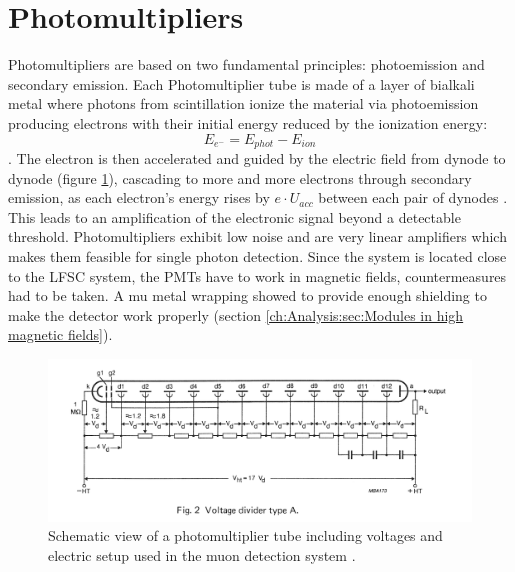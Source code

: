   \section{Photomultipliers}
  \label{ch:The muon detection system:sec:Photomultipliers}
  Photomultipliers are based on two fundamental principles: photoemission and secondary emission.
  Each Photomultiplier tube is made of a layer of bialkali metal where photons from scintillation ionize the material via photoemission producing electrons with their initial energy reduced by the ionization energy:
  $$E_{e^-} = E_{phot} - E_{ion}$$.
  The electron is then accelerated and guided by the electric field from dynode to dynode (figure \ref{fig:PMT}), cascading to more and more electrons through secondary emission, as each electron's energy rises by $e\cdot U_{acc}$ between each pair of dynodes \cite{photomultiplier}. This leads to an amplification of the electronic signal beyond a detectable threshold. Photomultipliers exhibit low noise and are very linear amplifiers which makes them feasible for single photon detection. Since the system is located close to the LFSC system, the PMTs have to work in magnetic fields, countermeasures had to be taken. A mu metal wrapping showed to provide enough shielding to make the detector work properly (section \ref{ch:Analysis:sec:Modules in high magnetic fields}).
  \begin{figure}
  	\centering
  	\includegraphics[width =  \textwidth]{graphics/setup/PMT.png}
  	\caption[Photomultiplier tube]{Schematic view of a photomultiplier tube including voltages and electric setup used in the muon detection system \cite{photomultiplier}.}
  	\label{fig:PMT}
  \end{figure}

  
  
